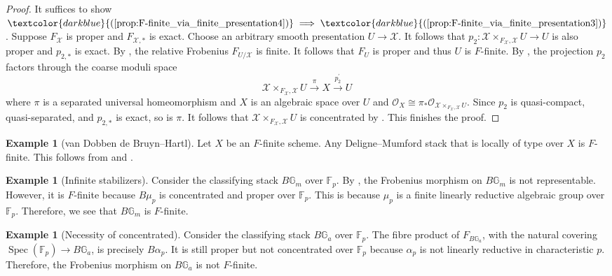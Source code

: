 \documentclass[11pt]{amsart}
\def\eqref#1{\textcolor{darkblue}{(\ref{#1})}}
\theoremstyle{plain}
\theoremstyle{definition}
\newtheorem{example}[theorem]{Example}
\numberwithin{equation}{section}
\numberwithin{theorem}{section}
\begin{document}
\begin{proof}
    It suffices to show $\eqref{prop:F-finite_via_finite_presentation4} \implies \eqref{prop:F-finite_via_finite_presentation3}$. 
    Suppose $F_\mathcal{X}$ is proper and $F_{\mathcal{X},\ast}$ is exact. Choose an arbitrary smooth presentation $U\to\mathcal{X}$.
    It follows that $p_2\colon \mathcal{X}\times_{F_\mathcal{X},\mathcal{X}} U\to U$ is also proper and $p_{2,\ast}$ is exact. By \cite[Lemma 3.2.4]{Olsson:2007}, the relative Frobenius $F_{U/\mathcal{X}}$ is finite. It follows that $F_U$ is proper and thus $U$ is $F$-finite.
    By \cite[Theorem 6.12]{Rydh:2013}, the projection $p_2$ factors through the coarse moduli space
    \begin{displaymath}
    \mathcal{X}\times_{F_\mathcal{X},\mathcal{X}} U\overset{\pi}{\longrightarrow} X\overset{p_2^\prime}{\longrightarrow} U
    \end{displaymath}
    where $\pi$ is a separated universal homeomorphism and $X$ is an algebraic space over $U$ and $\mathcal{O}_X\cong\pi_\ast\mathcal{O}_{\mathcal{X}\times_{F_\mathcal{X},\mathcal{X}} U}$. Since $p_2$ is quasi-compact, quasi-separated, and $p_{2,*}$ is exact, so is $\pi$. It follows that $\mathcal{X}\times_{F_\mathcal{X},\mathcal{X}} U$ is concentrated by \cite[Theorem 3.6]{Abramovich/Olsson/Vistoli:2008}. This finishes the proof.
\end{proof}

\begin{example}
    [van Dobben de Bruyn--Hartl]
    \label{ex:DM_F-finite}
    Let $X$ be an $F$-finite scheme. 
    Any Deligne--Mumford stack that is locally of type over $X$ is $F$-finite. This follows from  and .
\end{example}

\begin{example}
    [Infinite stabilizers]
    \label{ex:Gm_F-finite}
    Consider the classifying stack $B\mathbb{G}_m$ over $\mathbb{F}_p$. By , the Frobenius morphism on $B\mathbb{G}_m$ is not representable. 
    However, it is $F$-finite because $B\mu_p$ is concentrated and proper over $\mathbb{F}_p$. 
    This is because $\mu_p$ is a finite linearly reductive algebraic group over $\mathbb{F}_p$. 
    Therefore, we see that $B\mathbb{G}_m$ is $F$-finite. 
\end{example}

\begin{example}
    [Necessity of concentrated]
    \label{ex:Ga_not_F-finite}
    Consider the classifying stack $B\mathbb{G}_a$ over $\mathbb{F}_p$. 
    The fibre product of $F_{B\mathbb{G}_a}$, with the natural covering $\operatorname{Spec}(\mathbb{F}_p)\to B\mathbb{G}_a$, is precisely $B\alpha_p$. 
    It is still proper but not concentrated over $\mathbb{F}_p$ because $\alpha_p$ is not linearly reductive in characteristic $p$. 
    Therefore, the Frobenius morphism on $B\mathbb{G}_a$ is not $F$-finite. 
\end{example}
\end{document}
